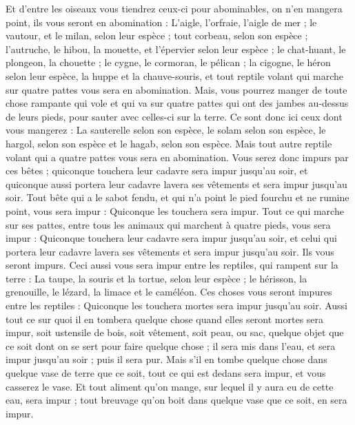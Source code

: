 \begin{multicols}{2}
Et d'entre les oiseaux vous tiendrez ceux-ci pour abominables, on n'en mangera point, ils vous seront en abomination : L'aigle, l'orfraie, l'aigle de mer ;
le vautour, et le milan, selon leur espèce ;
tout corbeau, selon son espèce ;
l'autruche, le hibou, la mouette, et l'épervier selon leur espèce ;
le chat-huant, le plongeon, la chouette ;
le cygne, le cormoran, le pélican ;
la cigogne, le héron selon leur espèce, la huppe et la chauve-souris,
et tout reptile volant qui marche sur quatre pattes vous sera en abomination.
Mais, vous pourrez manger de toute chose rampante qui vole et qui va sur quatre pattes qui ont des jambes au-dessus de leurs pieds, pour sauter avec celles-ci sur la terre.
Ce sont donc ici ceux dont vous mangerez : La sauterelle selon son espèce, le solam selon son espèce, le hargol, selon son espèce et le hagab, selon son espèce.
Mais tout autre reptile volant qui a quatre pattes vous sera en abomination.
Vous serez donc impurs par ces bêtes ; quiconque touchera leur cadavre sera impur jusqu'au soir,
et quiconque aussi portera leur cadavre lavera ses vêtements et sera impur jusqu'au soir.
Tout bête qui a le sabot fendu, et qui n'a point le pied fourchu et ne rumine point, vous sera impur : Quiconque les touchera sera impur.
Tout ce qui marche sur ses pattes, entre tous les animaux qui marchent à quatre pieds, vous sera impur : Quiconque touchera leur cadavre sera impur jusqu'au soir,
et celui qui portera leur cadavre lavera ses vêtements et sera impur jusqu'au soir. Ils vous seront impurs.
Ceci aussi vous sera impur entre les reptiles, qui rampent sur la terre : La taupe, la souris et la tortue, selon leur espèce ;
le hérisson, la grenouille, le lézard, la limace et le caméléon.
Ces choses vous seront impures entre les reptiles : Quiconque les touchera mortes sera impur jusqu'au soir.
Aussi tout ce sur quoi il en tombera quelque chose quand elles seront mortes sera impur, soit ustensile de bois, soit vêtement, soit peau, ou sac, quelque objet que ce soit dont on se sert pour faire quelque chose ; il sera mis dans l'eau, et sera impur jusqu'au soir ; puis il sera pur.
Mais s'il en tombe quelque chose dans quelque vase de terre que ce soit, tout ce qui est dedans sera impur, et vous casserez le vase.
Et tout aliment qu'on mange, sur lequel il y aura eu de cette eau, sera impur ; tout breuvage qu'on boit dans quelque vase que ce soit, en sera impur.

\end{multicols}
